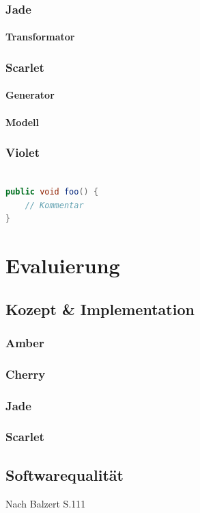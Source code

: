 \documentclass[12pt,oneside,a4paper,parskip]{scrbook}
\begin{document}
\subsection{Jade}
\subsubsection{Transformator}
\subsection{Scarlet}
\subsubsection{Generator}
\subsubsection{Modell}
\subsection{Violet}

\begin{lstlisting}[label=lst:java,
				   language=java,
				   firstnumber=1,
				   caption=Beispiel für einen Quelltext]

public void foo() {
	// Kommentar
}
\end{lstlisting}

\chapter{Evaluierung}
\section{Kozept \& Implementation}
\subsection{Amber}
\subsection{Cherry}
\subsection{Jade}
\subsection{Scarlet}
\section{Softwarequalität}
Nach Balzert S.111
\end{document}

